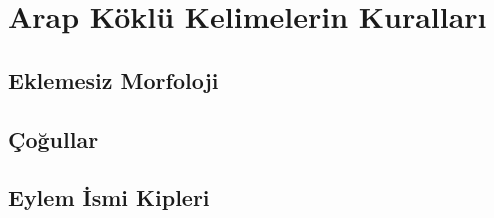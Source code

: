 
\chapter{Arap Köklü Kelimelerin Kuralları}
\section{Eklemesiz Morfoloji}

\section{Çoğullar}

\section{Eylem İsmi Kipleri}







